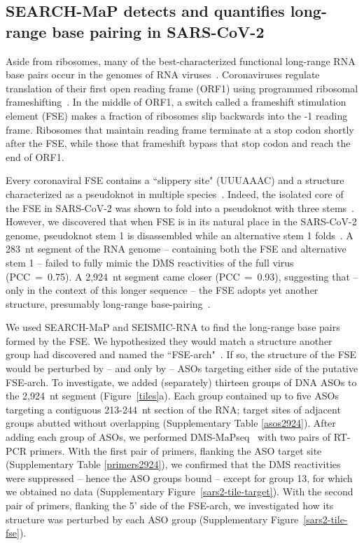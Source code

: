 \documentclass[main.tex]{subfiles}
\begin{document}
\subsection{SEARCH-MaP detects and quantifies long-range base pairing in SARS-CoV-2}

Aside from ribosomes, many of the best-characterized functional long-range RNA base pairs occur in the genomes of RNA viruses~\cite{Nicholson2014}.
Coronaviruses regulate translation of their first open reading frame (ORF1) using programmed ribosomal frameshifting~\cite{Plant2008}.
In the middle of ORF1, a switch called a frameshift stimulation element (FSE) makes a fraction of ribosomes slip backwards into the -1 reading frame.
Ribosomes that maintain reading frame terminate at a stop codon shortly after the FSE, while those that frameshift bypass that stop codon and reach the end of ORF1.

Every coronaviral FSE contains a ``slippery site" (UUUAAAC) and a structure characterized as a pseudoknot in multiple species~\cite{Brierley1989,Herald1993,Plant2005b}.
Indeed, the isolated core of the FSE in SARS-CoV-2 was shown to fold into a pseudoknot with three stems~\cite{KZhang2021,Roman2021,Jones2022}.
However, we discovered that when FSE is in its natural place in the SARS-CoV-2 genome, pseudoknot stem 1 is disassembled while an alternative stem 1 folds~\cite{Lan2022}.
A 283~nt segment of the RNA genome -- containing both the FSE and alternative stem 1 -- failed to fully mimic the DMS reactivities of the full virus (PCC~=~0.75).
A 2,924~nt segment came closer (PCC~=~0.93), suggesting that -- only in the context of this longer sequence -- the FSE adopts yet another structure, presumably long-range base-pairing~\cite{Lan2022}.

We used SEARCH-MaP and SEISMIC-RNA to find the long-range base pairs formed by the FSE.
We hypothesized they would match a structure another group had discovered and named the ``FSE-arch"~\cite{Ziv2020}.
If so, the structure of the FSE would be perturbed by -- and only by -- ASOs targeting either side of the putative FSE-arch.
To investigate, we added (separately) thirteen groups of DNA ASOs to the 2,924~nt segment (Figure~\ref{tiles}a).
Each group contained up to five ASOs targeting a contiguous 213-244~nt section of the RNA; target sites of adjacent groups abutted without overlapping (Supplementary Table \ref{asos2924}).
After adding each group of ASOs, we performed DMS-MaPseq~\cite{Zubradt2016} with two pairs of RT-PCR primers.
With the first pair of primers, flanking the ASO target site (Supplementary Table \ref{primers2924}), we confirmed that the DMS reactivities were suppressed -- hence the ASO groups bound -- except for group 13, for which we obtained no data (Supplementary Figure~\ref{sars2-tile-target}).
With the second pair of primers, flanking the 5' side of the FSE-arch, we investigated how its structure was perturbed by each ASO group (Supplementary Figure~\ref{sars2-tile-fse}).
\end{document}
